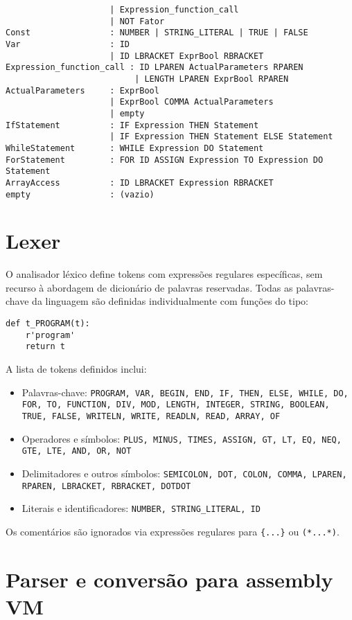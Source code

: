 \documentclass[12pt,a4paper]{report}%
\begin{document}
\begin{verbatim}
                     | Expression_function_call
                     | NOT Fator
Const                : NUMBER | STRING_LITERAL | TRUE | FALSE
Var                  : ID
                     | ID LBRACKET ExprBool RBRACKET
Expression_function_call : ID LPAREN ActualParameters RPAREN
                          | LENGTH LPAREN ExprBool RPAREN
ActualParameters     : ExprBool
                     | ExprBool COMMA ActualParameters
                     | empty
IfStatement          : IF Expression THEN Statement
                     | IF Expression THEN Statement ELSE Statement
WhileStatement       : WHILE Expression DO Statement
ForStatement         : FOR ID ASSIGN Expression TO Expression DO Statement
ArrayAccess          : ID LBRACKET Expression RBRACKET
empty                : (vazio)
\end{verbatim}


\section{Lexer}
O analisador léxico define tokens com expressões regulares específicas, sem recurso à abordagem de dicionário de palavras reservadas. Todas as palavras-chave da linguagem são definidas individualmente com funções do tipo:
\begin{verbatim}
def t_PROGRAM(t):
    r'program'
    return t
\end{verbatim}

A lista de tokens definidos inclui:

\begin{itemize}
  \item Palavras-chave: \texttt{PROGRAM, VAR, BEGIN, END, IF, THEN, ELSE, WHILE, DO, FOR, TO, FUNCTION, DIV, MOD, LENGTH, INTEGER, STRING, BOOLEAN, TRUE, FALSE, WRITELN, WRITE, READLN, READ, ARRAY, OF}
  \item Operadores e símbolos: \texttt{PLUS, MINUS, TIMES, ASSIGN, GT, LT, EQ, NEQ, GTE, LTE, AND, OR, NOT}
  \item Delimitadores e outros símbolos: \texttt{SEMICOLON, DOT, COLON, COMMA, LPAREN, RPAREN, LBRACKET, RBRACKET, DOTDOT}
  \item Literais e identificadores: \texttt{NUMBER, STRING\_LITERAL, ID}
\end{itemize}

Os comentários são ignorados via expressões regulares para \texttt{\{...\}} ou \texttt{(*...*)}.

\newpage
\section{Parser e conversão para assembly VM}
\end{document}
